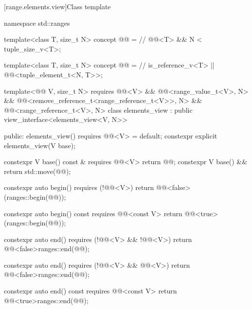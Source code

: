 [range.elements.view]{Class template }

%
%
%
%
%
\begin{codeblock}
namespace std::ranges {
  template<class T, size_t N>
  concept @@ =                   // \expos
    @@<T> && N < tuple_size_v<T>;

  template<class T, size_t N>
  concept @@ =                  // \expos
    is_reference_v<T> || @@<tuple_element_t<N, T>>;

  template<@@ V, size_t N>
    requires @@<V> && @@<range_value_t<V>, N> &&
             @@<remove_reference_t<range_reference_t<V>>, N> &&
             @@<range_reference_t<V>, N>
  class elements_view : public view_interface<elements_view<V, N>> {
  public:
    elements_view() requires @@<V> = default;
    constexpr explicit elements_view(V base);

    constexpr V base() const & requires @@<V> { return @@; }
    constexpr V base() && { return std::move(@@); }

    constexpr auto begin() requires (!@@<V>)
    { return @@<false>(ranges::begin(@@)); }

    constexpr auto begin() const requires @@<const V>
    { return @@<true>(ranges::begin(@@)); }

    constexpr auto end() requires (!@@<V> && !@@<V>)
    { return @@<false>{ranges::end(@@)}; }

    constexpr auto end() requires (!@@<V> && @@<V>)
    { return @@<false>{ranges::end(@@)}; }

    constexpr auto end() const requires @@<const V>
    { return @@<true>{ranges::end(@@)}; }

}}
\end{codeblock}
